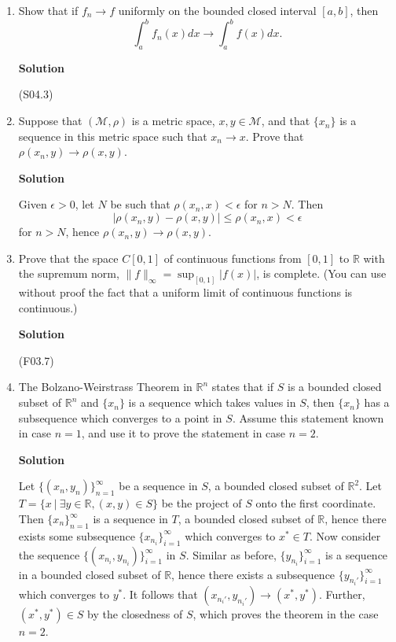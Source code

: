 \documentclass{article}
\begin{document}
\begin{enumerate}
\item Show that if \(f_n \to f\) uniformly on the bounded closed interval \([a,b]\), then
\[\int_a^b f_n(x) dx \to \int_a^b f(x) dx.\]

{\bf Solution}

(S04.3)



\item Suppose that \((\mathcal{M}, \rho)\) is a metric space, \(x,y \in \mathcal{M}\), and that \(\{x_n\}\) is a sequence in this metric space such that \(x_n \to x\).  Prove that \(\rho(x_n,y) \to \rho(x,y)\).

{\bf Solution}

Given \(\epsilon > 0\), let \(N\) be such that \(\rho(x_n, x) < \epsilon\) for \(n > N\).  Then
\[\left| \rho(x_n,y) - \rho(x,y) \right| \leq \rho(x_n,x) < \epsilon\]
for \(n > N\), hence \(\rho(x_n,y) \to \rho(x,y)\).



\item Prove that the space \(C[0,1]\) of continuous functions from \([0,1]\) to \(\mathbb{R}\) with the supremum norm, \(\|f\|_{\infty} = \sup_{[0,1]} |f(x)|\), is complete.  (You can use without proof the fact that a uniform limit of continuous functions is continuous.)

{\bf Solution}

(F03.7)



\item The Bolzano-Weirstrass Theorem in \(\mathbb{R}^n\) states that if \(S\) is a bounded closed subset of \(\mathbb{R}^n\) and \(\{x_n\}\) is a sequence which takes values in \(S\), then \(\{x_n\}\) has a subsequence which converges to a point in \(S\).  Assume this statement known in case \(n = 1\), and use it to prove the statement in case \(n = 2\).

{\bf Solution}

Let \(\{(x_n,y_n)\}_{n = 1}^{\infty}\) be a sequence in \(S\), a bounded closed subset of \(\mathbb{R}^2\).  Let \(T = \{x \ | \ \exists y \in \mathbb{R}, (x,y) \in S\}\) be the project of \(S\) onto the first coordinate.  Then \(\{x_n\}_{n = 1}^{\infty}\) is a sequence in \(T\), a bounded closed subset of \(\mathbb{R}\), hence there exists some subsequence \(\{x_{n_i}\}_{i = 1}^{\infty}\) which converges to \(x^* \in T\).  Now consider the sequence \(\{(x_{n_i}, y_{n_i})\}_{i = 1}^{\infty}\) in \(S\).  Similar as before, \(\{y_{n_i}\}_{i = 1}^{\infty}\) is a sequence in a bounded closed subset of \(\mathbb{R}\), hence there exists a subsequence \(\{y_{n_i'}\}_{i = 1}^{\infty}\) which converges to \(y^*\).  It follows that \((x_{n_i'}, y_{n_i'}) \to (x^*, y^*)\).  Further, \((x^*, y^*) \in S\) by the closedness of \(S\), which proves the theorem in the case \(n = 2\).




\end{enumerate}
\end{document}
